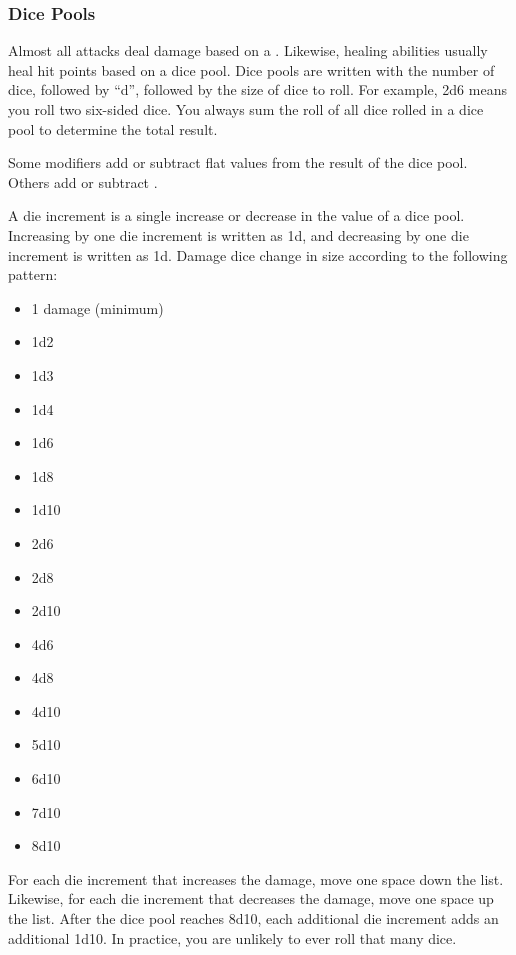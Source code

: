         \subsubsection{Dice Pools}\label{Dice Pools}
            Almost all attacks deal damage based on a .
            Likewise, healing abilities usually heal hit points based on a dice pool.
            Dice pools are written with the number of dice, followed by ``d'', followed by the size of dice to roll.
            For example, 2d6 means you roll two six-sided dice.
            You always sum the roll of all dice rolled in a dice pool to determine the total result.

            Some modifiers add or subtract flat values from the result of the dice pool.
            Others add or subtract .

            A die increment is a single increase or decrease in the value of a dice pool.
            Increasing by one die increment is written as \plus1d, and decreasing by one die increment is written as \minus1d.
            Damage dice change in size according to the following pattern:
            \begin{itemize}
                \item 1 damage (minimum)
                \item 1d2
                \item 1d3
                \item 1d4
                \item 1d6
                \item 1d8
                \item 1d10
                \item 2d6
                \item 2d8
                \item 2d10
                \item 4d6
                \item 4d8
                \item 4d10
                \item 5d10
                \item 6d10
                \item 7d10
                \item 8d10
            \end{itemize}

            For each die increment that increases the damage, move one space down the list.
            Likewise, for each die increment that decreases the damage, move one space up the list.
            After the dice pool reaches 8d10, each additional die increment adds an additional 1d10.
            In practice, you are unlikely to ever roll that many dice.

